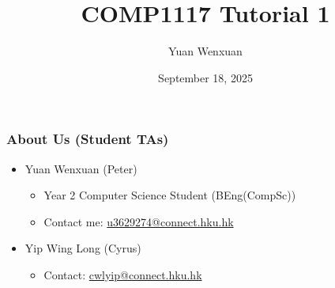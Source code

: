 \documentclass{beamer}
\title{COMP1117 Tutorial 1}
\author{Yuan Wenxuan}
\date{September 18, 2025}
\begin{document}
\frame{\titlepage}

\begin{frame}
    \frametitle{About Us (Student TAs)}

    \begin{itemize}
        \item Yuan Wenxuan (Peter)
              \begin{itemize}
                  \item Year 2 Computer Science Student (BEng(CompSc))
                  \item Contact me: \href{mailto:u3629274@connect.hku.hk}{u3629274@connect.hku.hk}
              \end{itemize}
        \item Yip Wing Long (Cyrus)
              \begin{itemize}
                  \item Contact: \href{mailto:cwlyip@connect.hku.hk}{cwlyip@connect.hku.hk }
              \end{itemize}
    \end{itemize}
\end{frame}
\end{document}
